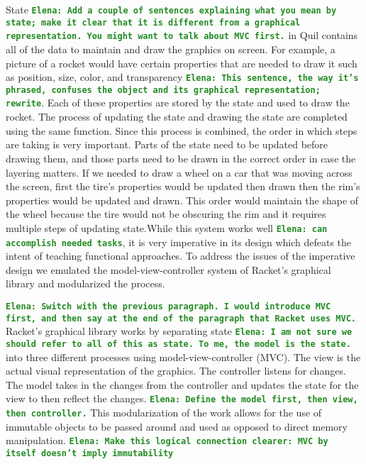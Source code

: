 \documentclass[12pt]{article}
\newcommand{\comment}[1]{{\bf \tt  {#1}}}
\newcommand{\emcomment}[1]{\textcolor{ForestGreen}{\comment{Elena: {#1}}}}
\begin{document}
State \emcomment{Add a couple of sentences explaining what you mean by state; make it clear that it is different from a graphical representation. You might want to talk about MVC first.} in Quil contains all of the data to maintain and draw the graphics on screen. For example, a picture of a rocket would have certain properties that are needed to draw it such as position, size, color, and transparency \emcomment{This sentence, the way it's phrased, confuses the object and its graphical representation; rewrite}. Each of these properties are stored by the state and used to draw the rocket. The process of updating the state and drawing the state are completed using the same function. Since this process is combined, the order in which steps are taking is very important. Parts of the state need to be updated before drawing them, and those parts need to be drawn in the correct order in case the layering matters. If we needed to draw a wheel on a car that was moving across the screen, first the tire's properties would be updated then drawn then the rim's properties would be updated and drawn. This order would maintain the shape of the wheel because the tire would not be obscuring the rim and it requires multiple steps of updating state.While this system works well \emcomment{can accomplish needed tasks}, it is very imperative in its design which defeats the intent of teaching functional approaches. To address the issues of the imperative design we emulated the model-view-controller system of Racket's graphical library and modularized the process. 

\emcomment{Switch with the previous paragraph. I would introduce MVC first, and then say at the end of the paragraph that Racket uses MVC.}
Racket's graphical library works by separating state \emcomment{I am not sure we should refer to all of this as state. To me, the model is the state.} into three different processes using model-view-controller (MVC). The view is the actual visual representation of the graphics. The controller listens for changes. The model takes in the changes from the controller and updates the state for the view to then reflect the changes. \emcomment{Define the model first, then view, then controller.} This modularization of the work allows for the use of immutable objects to be passed around and used as opposed to direct memory manipulation. \emcomment{Make this logical connection clearer: MVC by itself doesn't imply immutability}
\end{document}
